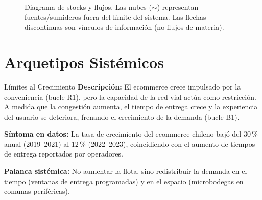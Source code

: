 \documentclass[12pt,a4paper]{article}
\begin{document}
\begin{figure}[H]
\caption{Diagrama de stocks y flujos. Las nubes ($\sim$) representan
  fuentes/sumideros fuera del límite del sistema.
  Las flechas discontinuas son vínculos de información (no flujos de materia).}
\label{fig:stocks}
\end{figure}

\section{Arquetipos Sistémicos}

\begin{arquetipobox}{Límites al Crecimiento}
\textbf{Descripción:} El ecommerce crece impulsado por la conveniencia
(bucle R1), pero la capacidad de la red vial actúa como restricción.
A medida que la congestión aumenta, el tiempo de entrega crece y la
experiencia del usuario se deteriora, frenando el crecimiento de la demanda
(bucle B1).

\textbf{Síntoma en datos:} La tasa de crecimiento del ecommerce chileno
bajó del 30\,\% anual (2019--2021) al 12\,\% (2022--2023), coincidiendo
con el aumento de tiempos de entrega reportados por operadores.

\textbf{Palanca sistémica:} No aumentar la flota, sino redistribuir la
demanda en el tiempo (ventanas de entrega programadas) y en el espacio
(microbodegas en comunas periféricas).
\end{arquetipobox}
\end{document}
